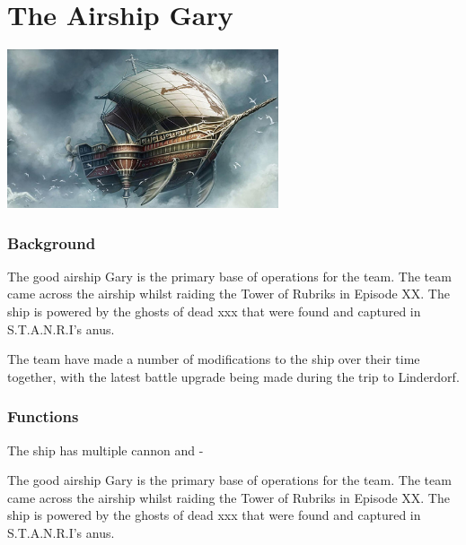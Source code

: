 

\section{The Airship Gary}

\begin{multicols}{2}

\begin{center}
\includegraphics[width=80mm]{./content/img/theGary.jpg}
\begin{figure}[h]
\end{figure}
\end{center}

\subsubsection{Background}

The good airship Gary is the primary base of operations for the team.  The team came across the airship whilst raiding the Tower of Rubriks in Episode XX.  The ship is powered by the ghosts of dead xxx that were found and captured in S.T.A.N.R.I's anus.  

The team have made a number of modifications to the ship over their time together, with the latest battle upgrade being made during the trip to Linderdorf.  


\subsubsection{Functions}

The ship has multiple cannon and    -    

The good airship Gary is the primary base of operations for the team.  The team came across the airship whilst raiding the Tower of Rubriks in Episode XX.  The ship is powered by the ghosts of dead xxx that were found and captured in S.T.A.N.R.I's anus.  


\end{multicols}
